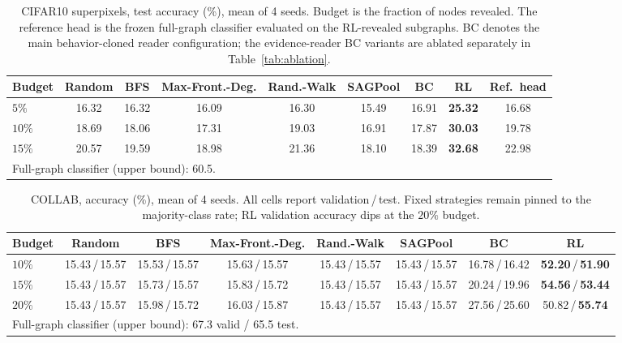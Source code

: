 \documentclass{article}
\begin{document}
\begin{table}[t]
\centering
\caption{CIFAR10 superpixels, test accuracy (\%), mean of 4 seeds. Budget is the fraction of nodes revealed. The reference head is the frozen full-graph classifier evaluated on the RL-revealed subgraphs. BC denotes the main behavior-cloned reader configuration; the evidence-reader BC variants are ablated separately in Table~\ref{tab:ablation}.}
\label{tab:cifar10}
\footnotesize
\setlength{\tabcolsep}{4pt}
\begin{tabular}{lcccccccc}
\toprule
Budget & Random & BFS & Max-Front.-Deg. & Rand.-Walk & SAGPool & BC & RL & Ref.\ head \\
\midrule
$5\%$  & 16.32 & 16.32 & 16.09 & 16.30 & 15.49 & 16.91 & \textbf{25.32} & 16.68 \\
$10\%$ & 18.69 & 18.06 & 17.31 & 19.03 & 16.91 & 17.87 & \textbf{30.03} & 19.78 \\
$15\%$ & 20.57 & 19.59 & 18.98 & 21.36 & 18.10 & 18.39 & \textbf{32.68} & 22.98 \\
\midrule
\multicolumn{9}{l}{\footnotesize Full-graph classifier (upper bound): 60.5.}
\\
\bottomrule
\end{tabular}
\end{table}

\begin{table}[t]
\centering
\caption{COLLAB, accuracy (\%), mean of 4 seeds. All cells report validation\,/\,test. Fixed strategies remain pinned to the majority-class rate; RL validation accuracy dips at the $20\%$ budget.}
\label{tab:collab}
\footnotesize
\setlength{\tabcolsep}{2.2pt}
\begin{tabular}{lccccccc}
\toprule
Budget & Random & BFS & Max-Front.-Deg. & Rand.-Walk & SAGPool & BC & RL \\
\midrule
$10\%$ & 15.43\,/\,15.57 & 15.53\,/\,15.57 & 15.63\,/\,15.57 & 15.43\,/\,15.57 & 15.43\,/\,15.57 & 16.78\,/\,16.42 & \textbf{52.20}\,/\,\textbf{51.90} \\
$15\%$ & 15.43\,/\,15.57 & 15.73\,/\,15.57 & 15.83\,/\,15.72 & 15.43\,/\,15.57 & 15.43\,/\,15.57 & 20.24\,/\,19.96 & \textbf{54.56}\,/\,\textbf{53.44} \\
$20\%$ & 15.43\,/\,15.57 & 15.98\,/\,15.72 & 16.03\,/\,15.87 & 15.43\,/\,15.57 & 15.43\,/\,15.57 & 27.56\,/\,25.60 & 50.82\,/\,\textbf{55.74} \\
\midrule
\multicolumn{8}{l}{\footnotesize Full-graph classifier (upper bound): 67.3 valid / 65.5 test.}
\\
\bottomrule
\end{tabular}
\end{table}
\end{document}
